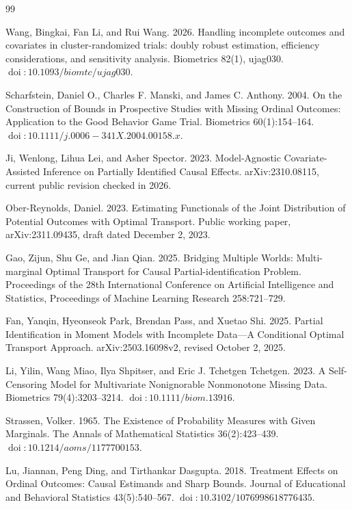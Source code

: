 \documentclass{article}
\begin{document}
\begin{thebibliography}{99}

   Wang, Bingkai, Fan Li, and Rui Wang. 2026. Handling incomplete outcomes and covariates in cluster-randomized trials: doubly robust estimation, efficiency considerations, and sensitivity analysis. Biometrics 82(1), ujag030. \(\operatorname{doi}:10.1093/biomtc/ujag030\).

   Scharfstein, Daniel O., Charles F. Manski, and James C. Anthony. 2004. On the Construction of Bounds in Prospective Studies with Missing Ordinal Outcomes: Application to the Good Behavior Game Trial. Biometrics 60(1):154--164. \(\operatorname{doi}:10.1111/j.0006-341X.2004.00158.x\).

   Ji, Wenlong, Lihua Lei, and Asher Spector. 2023. Model-Agnostic Covariate-Assisted Inference on Partially Identified Causal Effects. arXiv:2310.08115, current public revision checked in 2026.

   Ober-Reynolds, Daniel. 2023. Estimating Functionals of the Joint Distribution of Potential Outcomes with Optimal Transport. Public working paper, arXiv:2311.09435, draft dated December 2, 2023.

   Gao, Zijun, Shu Ge, and Jian Qian. 2025. Bridging Multiple Worlds: Multi-marginal Optimal Transport for Causal Partial-identification Problem. Proceedings of the 28th International Conference on Artificial Intelligence and Statistics, Proceedings of Machine Learning Research 258:721--729.

   Fan, Yanqin, Hyeonseok Park, Brendan Pass, and Xuetao Shi. 2025. Partial Identification in Moment Models with Incomplete Data---A Conditional Optimal Transport Approach. arXiv:2503.16098v2, revised October 2, 2025.

   Li, Yilin, Wang Miao, Ilya Shpitser, and Eric J. Tchetgen Tchetgen. 2023. A Self-Censoring Model for Multivariate Nonignorable Nonmonotone Missing Data. Biometrics 79(4):3203--3214. \(\operatorname{doi}:10.1111/biom.13916\).

   Strassen, Volker. 1965. The Existence of Probability Measures with Given Marginals. The Annals of Mathematical Statistics 36(2):423--439. \(\operatorname{doi}:10.1214/aoms/1177700153\).

   Lu, Jiannan, Peng Ding, and Tirthankar Dasgupta. 2018. Treatment Effects on Ordinal Outcomes: Causal Estimands and Sharp Bounds. Journal of Educational and Behavioral Statistics 43(5):540--567. \(\operatorname{doi}:10.3102/1076998618776435\).


\end{thebibliography}
\end{document}
